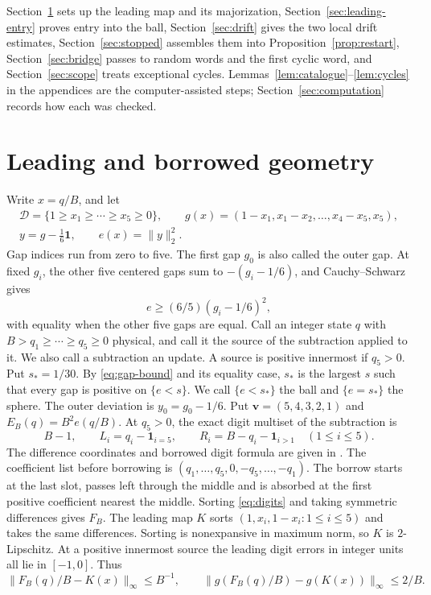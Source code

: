 \documentclass[11pt,reqno]{amsart}
\theoremstyle{remark}
\newcommand{\vct}{\boldsymbol v}
\begin{document}
Section~\ref{sec:geometry} sets up the leading map and its majorization, Section~\ref{sec:leading-entry} proves entry into the ball, Section~\ref{sec:drift} gives the two local drift estimates, Section~\ref{sec:stopped} assembles them into Proposition~\ref{prop:restart}, Section~\ref{sec:bridge} passes to random words and the first cyclic word, and Section~\ref{sec:scope} treats exceptional cycles. Lemmas~\ref{lem:catalogue}--\ref{lem:cycles} in the appendices are the computer-assisted steps; Section~\ref{sec:computation} records how each was checked.

\section{Leading and borrowed geometry}\label{sec:geometry}

Write \(x=q/B\), and let
\begin{gather*}
 \mathcal D=\{1\ge x_1\ge\cdots\ge x_5\ge0\},\qquad
 g(x)=(1-x_1,x_1-x_2,\ldots,x_4-x_5,x_5),\\
 y=g-\tfrac16\boldsymbol 1,\qquad e(x)=\|y\|_2^2.
\end{gather*}
Gap indices run from zero to five. The first gap \(g_0\) is also called the outer gap. At fixed \(g_i\), the other five centered gaps sum to \(-(g_i-1/6)\), and Cauchy--Schwarz gives
\begin{equation}\label{eq:gap-bound}
 e\ge(6/5)(g_i-1/6)^2 ,
\end{equation}
with equality when the other five gaps are equal. Call an integer state \(q\) with \(B>q_1\ge\cdots\ge q_5\ge0\) physical, and call it the source of the subtraction applied to it. We also call a subtraction an update. A source is positive innermost if \(q_5>0\). Put \(s_*=1/30\). By \eqref{eq:gap-bound} and its equality case, \(s_*\) is the largest \(s\) such that every gap is positive on \(\{e<s\}\). We call \(\{e<s_*\}\) the ball and \(\{e=s_*\}\) the sphere. The outer deviation is \(y_0=g_0-1/6\). Put \(\vct=(5,4,3,2,1)\) and \(E_B(q)=B^2e(q/B)\). At \(q_5>0\), the exact digit multiset of the subtraction is
\begin{equation}\label{eq:digits}
 B-1,\qquad L_i=q_i-\mathbf1_{i=5},\qquad R_i=B-q_i-\mathbf1_{i>1}
 \quad (1\le i\le5).
\end{equation}
The difference coordinates and borrowed digit formula are given in \cite[Section 2.7]{Thakur}. The coefficient list before borrowing is
\((q_1,\ldots,q_5,0,-q_5,\ldots,-q_1)\). The borrow starts at the last slot, passes left through the middle and is absorbed at the first positive coefficient nearest the middle. Sorting \eqref{eq:digits} and taking symmetric differences gives \(F_B\). The leading map \(K\) sorts \((1,x_i,1-x_i:1\le i\le5)\) and takes the same differences. Sorting is nonexpansive in maximum norm, so \(K\) is \(2\)-Lipschitz. At a positive innermost source the leading digit errors in integer units all lie in \([-1,0]\). Thus
\begin{equation}\label{eq:track}
 \|F_B(q)/B-K(x)\|_\infty\le B^{-1},\qquad
 \|g(F_B(q)/B)-g(K(x))\|_\infty\le2/B .
\end{equation}
\end{document}
